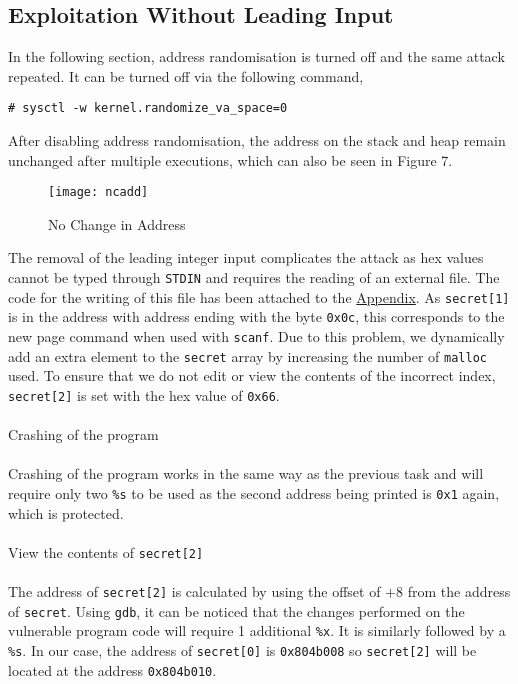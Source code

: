 \documentclass[a4paper,12pt]{article}
\newcommand*\circled[1]{\tikz[baseline=(char.base)]{
		\node[shape=circle,draw,inner sep=2pt] (char) {#1};}}
\begin{document}
\subsection{Exploitation Without Leading Input}
In the following section, address randomisation is turned off and the same attack repeated. It can be turned off via the following command,
\begin{verbatim}
# sysctl -w kernel.randomize_va_space=0
\end{verbatim}
After disabling address randomisation, the address on the stack and heap remain unchanged after multiple executions, which can also be seen in Figure 7.
\begin{figure}[H]
	\centering
	\texttt{[image: ncadd]}
	\caption{No Change in Address}
	\label{fig:ncadd}
\end{figure}
\noindent 
The removal of the leading integer input complicates the attack as hex values cannot be typed through \texttt{STDIN} and requires the reading of an external file. The code for the writing of this file has been attached to the \hyperref[Appsec:3.2]{Appendix}. As \texttt{secret[1]} is in the address with address ending with the byte \texttt{0x0c}, this corresponds to the new page command when used with \texttt{scanf}. Due to this problem, we dynamically add an extra element to the \texttt{secret} array by increasing the number of \texttt{malloc} used. To ensure that we do not edit or view the contents of the incorrect index, \texttt{secret[2]} is set with the hex value of \texttt{0x66}.
\\\\\circled{1} Crashing of the program\\\\Crashing of the program works in the same way as the previous task and will require only two \texttt{\%s} to be used as the second address being printed is \texttt{0x1} again, which is protected.\\\\\circled{2} View the contents of \texttt{secret[2]}\\\\The address of \texttt{secret[2]} is calculated by using the offset of $+8$ from the address of \texttt{secret}. Using \texttt{gdb}, it can be noticed that the changes performed on the vulnerable program code will require 1 additional \texttt{\%x}. It is similarly followed by a \texttt{\%s}. In our case, the address of \texttt{secret[0]} is \texttt{0x804b008} so \texttt{secret[2]} will be located at the address \texttt{0x804b010}.
\end{document}
